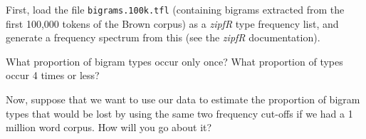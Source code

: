 \documentclass[a4paper,12pt]{article}
\begin{document}
First, load the file \texttt{bigrams.100k.tfl} (containing bigrams extracted
from the first 100,000 tokens of the Brown corpus) as a \emph{zipfR} type
frequency list, and generate a frequency spectrum from this (see the
\emph{zipfR} documentation).

What proportion of bigram types occur only once? What proportion of types
occur 4 times or less?

Now, suppose that we want to use our data to estimate the proportion
of bigram types that would be lost by using the same two frequency
cut-offs if we had a 1 million word corpus.  How will you go about it?
\end{document}

